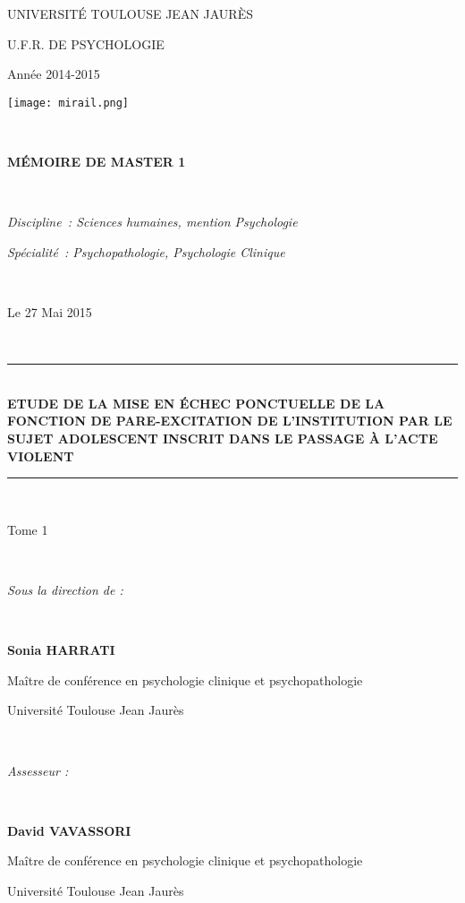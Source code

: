 \documentclass[12pt, openany]{report}
\newcommand{\HRule}{\rule{\linewidth}{0.5mm}}
\begin{document}
\begin{titlepage}
\begin{sffamily}
\begin{center}

\begin{multicols}{2}
\begin{flushleft}
UNIVERSITÉ TOULOUSE JEAN JAURÈS

U.F.R. DE PSYCHOLOGIE

Année 2014-2015
\end{flushleft}
\begin{flushright}
\texttt{[image: mirail.png]}
\end{flushright}
\end{multicols}
\\[3cm]
\centerline{\Large \bfseries MÉMOIRE DE MASTER 1}\\[0.5cm]

\centerline{\textit{Discipline : Sciences humaines, mention Psychologie}}
\centerline{\textit{Spécialité : Psychopathologie, Psychologie Clinique}}\\[1.5cm]

\centerline{\Large Le 27 Mai 2015}\\[2cm]

\HRule \\[0.4cm]
{ \Large \bfseries ETUDE DE LA MISE EN ÉCHEC PONCTUELLE DE LA FONCTION DE PARE-EXCITATION DE L’INSTITUTION PAR LE SUJET ADOLESCENT INSCRIT DANS LE PASSAGE À L’ACTE VIOLENT\\[0.4cm] }

\HRule \\[3mm]

\centerline{Tome 1}\\[2.3cm]

\centerline{\Large \textit{Sous la direction de :}}\\[6mm]
\centerline{\Large \bfseries Sonia HARRATI}
\centerline{\Large Maître de conférence en psychologie clinique et psychopathologie}
\centerline{\Large Université Toulouse Jean Jaurès}\\[1cm]
\centerline{\Large \textit{Assesseur :}}\\[6mm]
\centerline{\Large \bfseries David VAVASSORI}
\centerline{\Large Maître de conférence en psychologie clinique et psychopathologie}
\centerline{\Large Université Toulouse Jean Jaurès}\\[1cm]
\end{center}
\end{sffamily}
\end{titlepage}
\end{document}
